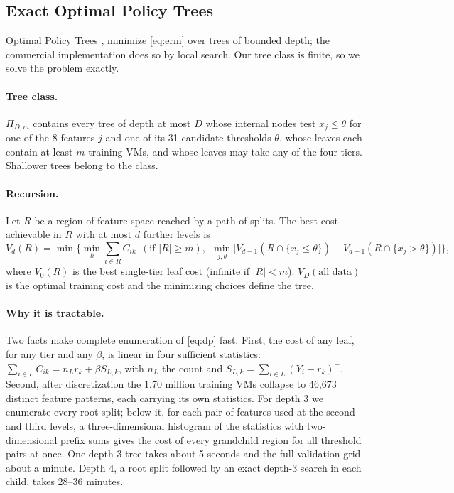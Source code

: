 \documentclass[10pt]{article}
\begin{document}
\subsection{Exact Optimal Policy Trees}
\label{sec:opt}

Optimal Policy Trees \citep{amram2022opt}, \citep[Ch.~14]{bertsimas2019mlopt} minimize \eqref{eq:erm} over trees of bounded depth; the commercial implementation does so by local search. Our tree class is finite, so we solve the problem exactly.

\paragraph{Tree class.} $\Pi_{D,m}$ contains every tree of depth at most $D$ whose internal nodes test $x_j\le\theta$ for one of the 8 features $j$ and one of its 31 candidate thresholds $\theta$, whose leaves each contain at least $m$ training VMs, and whose leaves may take any of the four tiers. Shallower trees belong to the class.

\paragraph{Recursion.} Let $R$ be a region of feature space reached by a path of splits. The best cost achievable in $R$ with at most $d$ further levels is
\begin{equation}
V_d(R)=\min\Big\{\textstyle\min_k \sum_{i\in R}C_{ik}\ \ (\text{if }|R|\ge m),\ \ \min_{j,\theta}\big[V_{d-1}(R\cap\{x_j\le\theta\})+V_{d-1}(R\cap\{x_j>\theta\})\big]\Big\},
\label{eq:dp}
\end{equation}
where $V_0(R)$ is the best single-tier leaf cost (infinite if $|R|<m$). $V_D(\text{all data})$ is the optimal training cost and the minimizing choices define the tree.

\paragraph{Why it is tractable.} Two facts make complete enumeration of \eqref{eq:dp} fast. First, the cost of any leaf, for any tier and any $\beta$, is linear in four sufficient statistics: $\sum_{i\in L}C_{ik}=n_Lr_k+\beta S_{L,k}$, with $n_L$ the count and $S_{L,k}=\sum_{i\in L}(Y_i-r_k)^+$. Second, after discretization the 1.70 million training VMs collapse to 46,673 distinct feature patterns, each carrying its own statistics. For depth 3 we enumerate every root split; below it, for each pair of features used at the second and third levels, a three-dimensional histogram of the statistics with two-dimensional prefix sums gives the cost of every grandchild region for all threshold pairs at once. One depth-3 tree takes about 5 seconds and the full validation grid about a minute. Depth 4, a root split followed by an exact depth-3 search in each child, takes 28--36 minutes.
\end{document}
